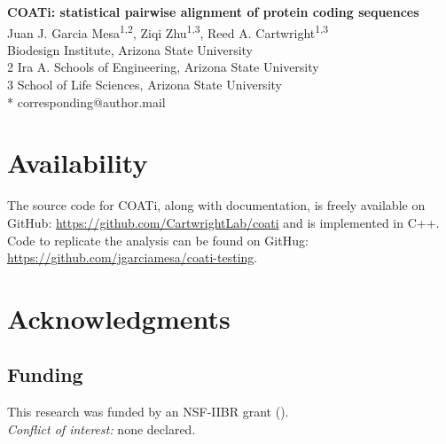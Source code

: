 



\begin{flushleft}
{\Large\textbf{COATi: statistical pairwise alignment of protein coding sequences}}
\newline
\\
Juan J. Garcia Mesa\textsuperscript{1,2},
Ziqi Zhu\textsuperscript{1,3},
Reed A. Cartwright\textsuperscript{1,3}
\\
 Biodesign Institute, Arizona State University
\\
2 Ira A. Schools of Engineering, Arizona State University
\\
3 School of Life Sciences, Arizona State University
\\
\bigskip
* corresponding@author.mail

\end{flushleft}



\linenumbers







\section*{Availability}
The source code for COATi, along with documentation, is
freely available on GitHub: \url{https://github.com/CartwrightLab/coati} and is
implemented in C++.
Code to replicate the analysis can be found on GitHug: \url{https://github.com/jgarciamesa/coati-testing}.


\section*{Acknowledgments}


\subsection*{Funding}
This research was funded by an NSF-IIBR grant ().\\

\noindent \textit{Conflict of interest:} none declared.

\printbibliography

\nolinenumbers


